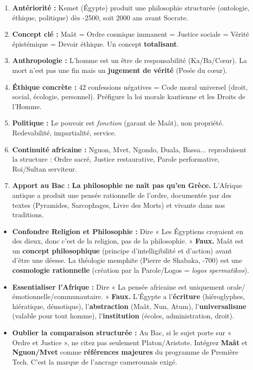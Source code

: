\documentclass[11pt]{article}
\newcommand{\cle}[1]{{\popxbold\color{popdark}#1}}
\begin{document}
\begin{aretenir}
\begin{enumerate}
    \item \textbf{Antériorité :} Kemet (Égypte) produit une philosophie structurée (ontologie, éthique, politique) dès -2500, soit 2000 ans avant Socrate.
    \item \textbf{Concept clé :} \cle{Maât} = Ordre cosmique immanent = Justice sociale = Vérité épistémique = Devoir éthique. Un concept \textbf{totalisant}.
    \item \textbf{Anthropologie :} L'homme est un être de responsabilité (Ka/Ba/Cœur). La mort n'est pas une fin mais un \textbf{jugement de vérité} (Pesée du cœur).
    \item \textbf{Éthique concrète :} 42 confessions négatives = Code moral universel (droit, social, écologie, personnel). Préfigure la loi morale kantienne et les Droits de l'Homme.
    \item \textbf{Politique :} Le pouvoir est \emph{fonction} (garant de Maât), non propriété. Redevabilité, impartialité, service.
    \item \textbf{Continuité africaine :} Nguon, Mvet, Ngondo, Duala, Bassa... reproduisent la structure : Ordre sacré, Justice restaurative, Parole performative, Roi/Sultan serviteur.
    \item \textbf{Apport au Bac :} \textbf{La philosophie ne naît pas qu'en Grèce.} L'Afrique antique a produit une pensée rationnelle de l'ordre, documentée par des textes (Pyramides, Sarcophages, Livre des Morts) et vivante dans nos traditions.
\end{enumerate}
\end{aretenir}

\begin{attention}
\begin{itemize}
    \item \textbf{Confondre Religion et Philosophie :} Dire « Les Égyptiens croyaient en des dieux, donc c'est de la religion, pas de la philosophie. » \textbf{Faux.} Maât est un \textbf{concept philosophique} (principe d'intelligibilité et d'action) avant d'être une déesse. La théologie memphite (Pierre de Shabaka, -700) est une \textbf{cosmologie rationnelle} (création par la Parole/Logos = \textit{logos spermatikos}).
    \item \textbf{Essentialiser l'Afrique :} Dire « La pensée africaine est uniquement orale/émotionnelle/communautaire. » \textbf{Faux.} L'Égypte a l'\textbf{écriture} (hiéroglyphes, hiératique, démotique), l'\textbf{abstraction} (Maât, Nun, Atum), l'\textbf{universalisme} (valable pour tout homme), l'\textbf{institution} (écoles, administration, droit).
    \item \textbf{Oublier la comparaison structurée :} Au Bac, si le sujet porte sur « Ordre et Justice », ne citez pas seulement Platon/Aristote. Intégrez \textbf{Maât} et \textbf{Nguon/Mvet} comme \textbf{références majeures} du programme de Première Tech. C'est la marque de l'ancrage camerounais exigé.
\end{itemize}
\end{attention}
\end{document}
